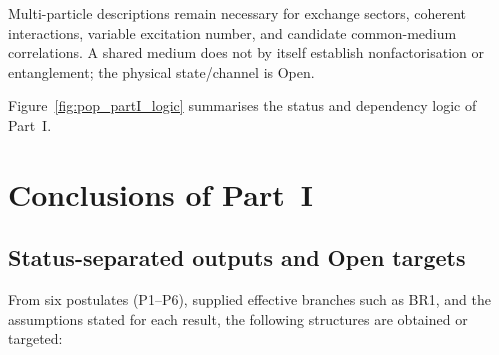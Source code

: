 \documentclass[11pt,a4paper]{article}
\begin{document}
Multi-particle descriptions remain necessary for exchange sectors, coherent interactions, variable excitation number, and candidate common-medium correlations. A shared medium does not by itself establish nonfactorisation or entanglement; the physical state/channel is Open.

Figure~\ref{fig:pop_partI_logic} summarises the status and dependency logic
of Part~I.


\section{Conclusions of Part~I}

\subsection{Status-separated outputs and Open targets}

From six postulates (P1--P6), supplied effective branches such as BR1, and the assumptions stated for each result, the following structures are obtained or targeted:
\end{document}
